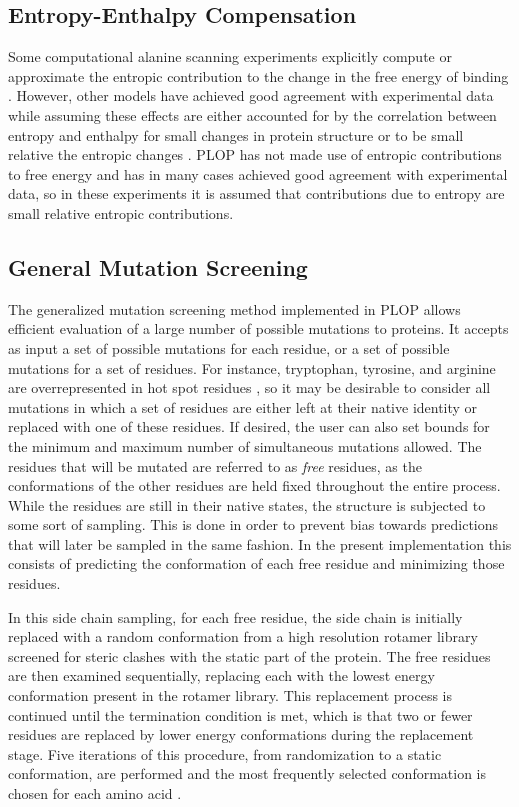 \subsection{Entropy-Enthalpy Compensation}
Some computational alanine scanning experiments explicitly compute or approximate the entropic contribution to the change in the free energy of binding \cite{hao2010computational,guerois2002predicting}. 
However, other models have achieved good agreement with experimental data while assuming these effects are either accounted for by the correlation between entropy and enthalpy for small changes in protein structure \cite{sharp2001entropy} or to be small relative the entropic changes \cite{kortemme2004computational}.
PLOP has not made use of entropic contributions to free energy and has in many cases achieved good agreement with experimental data, so in these experiments it is assumed that contributions due to entropy are small relative entropic contributions.

\subsection{General Mutation Screening}
The generalized mutation screening method implemented in PLOP allows efficient evaluation of a large number of possible mutations to proteins.
It accepts as input a set of possible mutations for each residue, or a set of possible mutations for a set of residues.
For instance, tryptophan, tyrosine, and arginine are overrepresented in hot spot residues \cite{hu2000conservation}, so it may be desirable to consider all mutations in which a set of residues are either left at their native identity or replaced with one of these residues.
If desired, the user can also set bounds for the minimum and maximum number of simultaneous mutations allowed.
The residues that will be mutated are referred to as {\it free} residues, as the conformations of the other residues are held fixed throughout the entire process.
While the residues are still in their native states, the structure is subjected to some sort of sampling.
This is done in order to prevent bias towards predictions that will later be sampled in the same fashion.
In the present implementation this consists of predicting the conformation of each free residue and minimizing those residues.

In this side chain sampling, for each free residue, the side chain is initially replaced with a random conformation from a high resolution rotamer library screened for steric clashes with the static part of the protein.
The free residues are then examined sequentially, replacing each with the lowest energy conformation present in the rotamer library.
This replacement process is continued until the termination condition is met, which is that two or fewer residues are replaced by lower energy conformations during the replacement stage.
Five iterations of this procedure, from randomization to a static conformation, are performed and the most frequently selected conformation is chosen for each amino acid \cite{jacobson2002force,jacobson2002role}.

